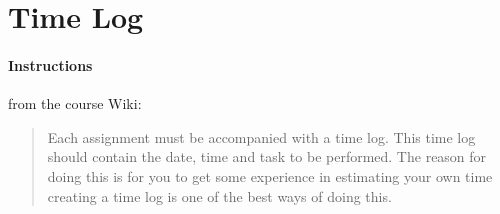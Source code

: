 %
%
%
%


\section{Time Log}\label{time-log}

\paragraph{Instructions}\label{task-3-instructions}
from the course Wiki\cite{1dv600:lab1:instructions}:

\begin{quote}
  Each assignment must be accompanied with a time log. This time log should
  contain the date, time and task to be performed. The reason for doing this is
  for you to get some experience in estimating your own time creating a time
  log is one of the best ways of doing this.
\end{quote}




